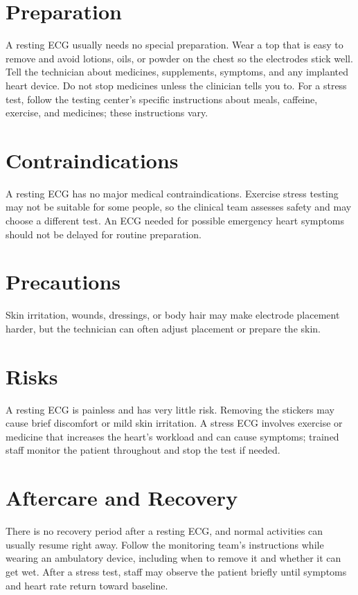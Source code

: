 \section*{Preparation}
A resting ECG usually needs no special preparation. Wear a top that is easy to remove and avoid lotions, oils, or powder on the chest so the electrodes stick well. Tell the technician about medicines, supplements, symptoms, and any implanted heart device. Do not stop medicines unless the clinician tells you to. For a stress test, follow the testing center's specific instructions about meals, caffeine, exercise, and medicines; these instructions vary.

\section*{Contraindications}
A resting ECG has no major medical contraindications. Exercise stress testing may not be suitable for some people, so the clinical team assesses safety and may choose a different test. An ECG needed for possible emergency heart symptoms should not be delayed for routine preparation.

\section*{Precautions}
Skin irritation, wounds, dressings, or body hair may make electrode placement harder, but the technician can often adjust placement or prepare the skin.

\section*{Risks}
A resting ECG is painless and has very little risk. Removing the stickers may cause brief discomfort or mild skin irritation. A stress ECG involves exercise or medicine that increases the heart's workload and can cause symptoms; trained staff monitor the patient throughout and stop the test if needed.

\section*{Aftercare and Recovery}
There is no recovery period after a resting ECG, and normal activities can usually resume right away. Follow the monitoring team's instructions while wearing an ambulatory device, including when to remove it and whether it can get wet. After a stress test, staff may observe the patient briefly until symptoms and heart rate return toward baseline.

